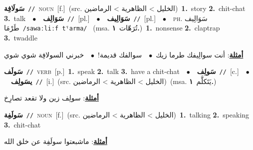\documentclass[10pt,a4paper,twoside]{article} %
\begin{document}
\begin{multicols}{2}
{\setlength\topsep{0pt}\textbf{\foreignlanguage{arabic}{سَولَافِة}}\ {\color{gray}\texttt{//}\color{black}}\ \textsc{noun}\ [f.]\ (src. \color{gray}\foreignlanguage{arabic}{الخليل > الظاهرية > الرماضين}\color{black})\ \textbf{1.}~story  \textbf{2.}~chit-chat  \textbf{3.}~talk\ \ $\bullet$\ \ \setlength\topsep{0pt}\textbf{\foreignlanguage{arabic}{سَوَالِف}}\ {\color{gray}\texttt{//}\color{black}}\ [pl.]\ \ $\bullet$\ \ \setlength\topsep{0pt}\textbf{\foreignlanguage{arabic}{سَوَالِيف}}\ {\color{gray}\texttt{//}\color{black}}\ [pl.]\ \ $\bullet$\ \ \textsc{ph.} \color{gray} \foreignlanguage{arabic}{سَوَالِيف طَرْمَا}\color{black}\ {\color{gray}\texttt{/{\sffamily sawaːliːf tˤarma}/}\color{black}}\ \color{gray} (msa. \foreignlanguage{arabic}{تُرَهّات}~\foreignlanguage{arabic}{\textbf{١.}})\color{black}\ \textbf{1.}~nonsense  \textbf{2.}~claptrap  \textbf{3.}~twaddle\  \begin{flushright}\color{gray}\foreignlanguage{arabic}{\textbf{\underline{\foreignlanguage{arabic}{أمثلة}}}: أنت سوالِيفك طرما زيك\ $\bullet$\ \  سوالفك قديمة!\ $\bullet$\ \  خبرني السولافِة شوي شوي}\end{flushright}\color{black}} \vspace{2mm}

{\setlength\topsep{0pt}\textbf{\foreignlanguage{arabic}{سَولَف}}\ {\color{gray}\texttt{//}\color{black}}\ \textsc{verb}\ [p.]\ \textbf{1.}~speak  \textbf{2.}~talk  \textbf{3.}~have a chit-chat\ \ $\bullet$\ \ \setlength\topsep{0pt}\textbf{\foreignlanguage{arabic}{سَولِف}}\ {\color{gray}\texttt{//}\color{black}}\ [c.]\ \ $\bullet$\ \ \setlength\topsep{0pt}\textbf{\foreignlanguage{arabic}{يسَولِف}}\ {\color{gray}\texttt{//}\color{black}}\ [i.]\ (src. \color{gray}\foreignlanguage{arabic}{الخليل > الظاهرية > الرماضين}\color{black})\ \color{gray}(msa. \foreignlanguage{arabic}{يَتَكلَّم}~\foreignlanguage{arabic}{\textbf{١.}})\color{black}\  \begin{flushright}\color{gray}\foreignlanguage{arabic}{\textbf{\underline{\foreignlanguage{arabic}{أمثلة}}}: سولِف زين ولا تقعد تصارِخ}\end{flushright}\color{black}} \vspace{2mm}

{\setlength\topsep{0pt}\textbf{\foreignlanguage{arabic}{سَولَفِة}}\ {\color{gray}\texttt{//}\color{black}}\ \textsc{noun}\ [f.]\ (src. \color{gray}\foreignlanguage{arabic}{الخليل > الظاهرية > الرماضين}\color{black})\ \textbf{1.}~talking  \textbf{2.}~speaking  \textbf{3.}~chit-chat\  \begin{flushright}\color{gray}\foreignlanguage{arabic}{\textbf{\underline{\foreignlanguage{arabic}{أمثلة}}}: ماشبعتوا سولَفِة عن خلق الله}\end{flushright}\color{black}} \vspace{2mm}


\end{multicols}
\end{document}
